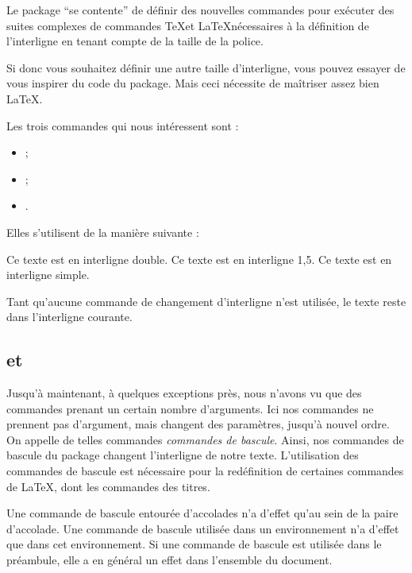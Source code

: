 \begin{plusloins}
Le package   \enquote{se contente} de définir des nouvelles commandes pour exécuter des suites complexes de commandes \TeX et \LaTeX nécessaires à la définition de l'interligne en tenant compte de la taille de la police.

Si donc vous souhaitez définir une autre taille d'interligne, vous pouvez essayer de vous inspirer du code du package. Mais ceci nécessite de maîtriser assez bien \LaTeX.
\end{plusloins}

Les trois commandes qui nous intéressent sont :
\begin{itemize}
\item{} ;
\item{} ;
\item{}.
\end{itemize}

 Elles s'utilisent de la manière suivante :

\begin{latexcode}
\doublespacing
Ce texte est en interligne double.
\onehalfspacing
Ce texte est en interligne 1,5.
\singlespacing
Ce texte est en interligne simple.
\end{latexcode}

Tant qu'aucune commande de changement d'interligne n'est utilisée, le texte reste dans l'interligne courante.

\subsection{ et }\label{bascule}

Jusqu'à maintenant, à quelques exceptions près, nous n'avons vu que des commandes prenant un certain nombre d'arguments. Ici nos commandes ne prennent pas d'argument, mais changent des paramètres, jusqu'à nouvel ordre. On appelle de telles commandes \emph{commandes de bascule}. Ainsi, nos commandes de bascule du package  changent l'interligne de notre texte. L'utilisation des commandes de bascule est nécessaire pour la redéfinition de certaines commandes de \LaTeX, dont les commandes des titres.

Une commande de bascule entourée d'accolades n'a d'effet qu'au sein de la paire d'accolade. Une commande de bascule utilisée dans un environnement n'a d'effet que dans cet environnement. Si une commande de bascule est utilisée dans le préambule, elle a en général un effet dans l'ensemble du document.\label{porteebascule}

